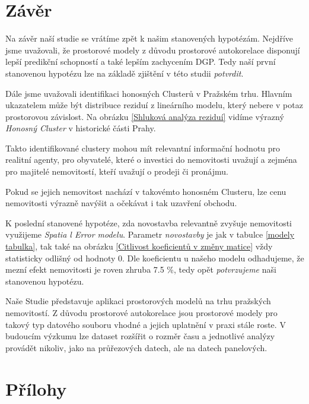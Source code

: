 \documentclass[11pt, a4paper]{article}
\begin{document}
\clearpage

\section{Závěr}

Na závěr naší studie se vrátíme zpět k našim stanovených hypotézám. Nejdříve jsme uvažovali, že prostorové modely z důvodu prostorové autokorelace disponují lepší predikční schopností a také lepším zachycením DGP. Tedy naší první stanovenou hypotézu lze na základě zjištění v této studii \textit{potvrdit}.

Dále jsme uvažovali identifikaci honosných Clusterů v Pražském trhu. Hlavním ukazatelem může být distribuce reziduí z lineárního modelu, který nebere v potaz prostorovou závislost. Na obrázku \ref{Shluková analýza reziduí} vidíme výrazný \textit{Honosný Cluster} v historické části Prahy. 

Takto identifikované clustery mohou mít relevantní informační hodnotu pro realitní agenty, pro obyvatelé, které o investici do nemovitosti uvažují a zejména pro majitelé nemovitostí, kteří uvažují o prodeji či pronájmu. 

Pokud se jejich nemovitost nachází v takovémto honosném Clusteru, lze cenu nemovitosti výrazně navýšit a očekávat i tak uzavření obchodu.

K poslední stanovené hypotéze, zda novostavba relevantně zvyšuje nemovitosti využijeme \textit{Spatia l Error modelu}. Parametr \textit{novostavby} je jak v tabulce \ref{modely tabulka}, tak také na obrázku \ref{Citlivost koeficientů v změny matice} vždy statisticky odlišný od hodnoty $0.$ Dle koeficientu u našeho modelu odhadujeme, že mezní efekt nemovitosti je roven zhruba 7.5 \%, tedy opět \textit{potvrzujeme} naši stanovenou hypotézu.


Naše Studie představuje aplikaci prostorových modelů na trhu pražských nemovitostí. Z důvodu prostorové autokorelace jsou prostorové modely pro takový typ datového souboru vhodné a jejich uplatnění v praxi stále roste. V budoucím výzkumu lze dataset rozšířit o rozměr času a jednotlivé analýzy provádět nikoliv, jako na průřezových datech, ale na datech panelových.






\clearpage
\section{Přílohy} \label{Přílohy}
\end{document}
